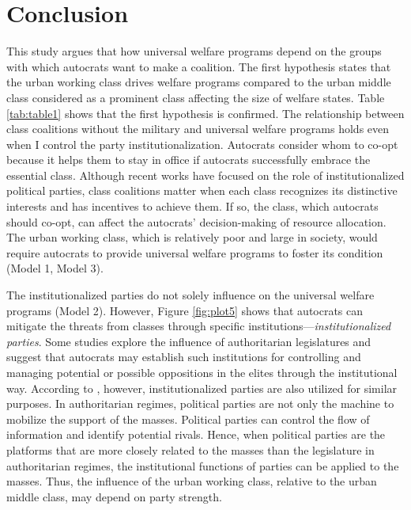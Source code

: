 \documentclass[12pt, letterpage, notitlepage]{article}
\begin{document}

\section{Conclusion}

This study argues that how universal welfare programs depend on the groups with which autocrats want to make a coalition. The first hypothesis states that the urban working class drives welfare programs compared to the urban middle class considered as a prominent class affecting the size of welfare states. Table \ref{tab:table1} shows that the first hypothesis is confirmed. The relationship between class coalitions without the military and universal welfare programs holds even when I control the party institutionalization. Autocrats consider whom to co-opt because it helps them to stay in office if autocrats successfully embrace the essential class. Although recent works have focused on the role of institutionalized political parties, class coalitions matter when each class recognizes its distinctive interests and has incentives to achieve them. If so, the class, which autocrats should co-opt, can affect the autocrats' decision-making of resource allocation. The urban working class, which is relatively poor and large in society, would require autocrats to provide universal welfare programs to foster its condition (Model 1, Model 3). 

The institutionalized parties do not solely influence on the universal welfare programs (Model 2). However, Figure \ref{fig:plot5} shows that autocrats can mitigate the threats from classes through specific institutions---\textit{institutionalized parties}. Some studies explore the influence of authoritarian legislatures \citep{Jensen2014, Truex2012} and suggest that autocrats may establish such institutions for controlling and managing potential or possible oppositions in the elites through the institutional way. According to \citet{Magaloni2006}, however, institutionalized parties are also utilized for similar purposes. In authoritarian regimes, political parties are not only the machine to mobilize the support of the masses. Political parties can control the flow of information and identify potential rivals. Hence, when political parties are the platforms that are more closely related to the masses than the legislature in authoritarian regimes, the institutional functions of parties can be applied to the masses. Thus, the influence of the urban working class, relative to the urban middle class, may depend on party strength.
\end{document}
